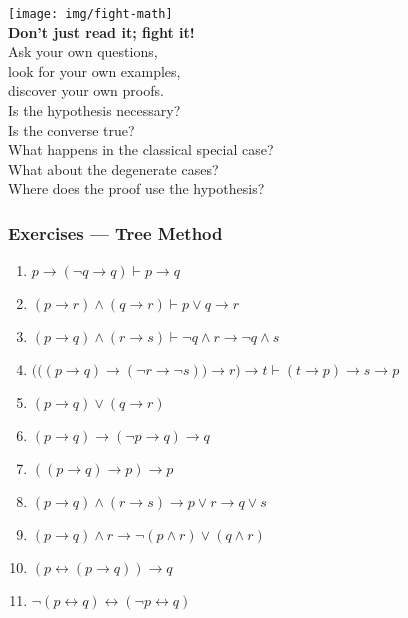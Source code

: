 \documentclass[UTF8,aspectratio=43,11pt,colorlinks,compress,openany]{beamer}%
\begin{document}
\begin{frame}\frametitle{}
\centering
\texttt{[image: img/fight-math]}\\
\textbf{Don't just read it; fight it!}\\
Ask your own questions,\\
look for your own examples,\\
discover your own proofs.\\
Is the hypothesis necessary?\\
Is the converse true?\\
What happens in the classical special case?\\
What about the degenerate cases?\\
Where does the proof use the hypothesis?
\end{frame}

\begin{frame}\frametitle{Exercises --- Tree Method}
		\begin{enumerate}
			\item $p\to(\neg q\to q)\vdash p\to q$
			\item $(p\to r)\wedge(q\to r)\vdash p\vee q\to r$
			\item $(p\to q)\wedge(r\to s)\vdash\neg q\wedge r\to\neg q\wedge s$
			\item $\Big(\big((p\to q)\to(\neg r\to\neg s)\big)\to r\Big)\to t\vdash (t\to p)\to s\to p$
			\item $(p\to q)\vee(q\to r)$
			\item $(p\to q)\to(\neg p\to q)\to q$
			\item $((p\to q)\to p)\to p$
			\item $(p\to q)\wedge(r\to s)\to p\vee r\to q\vee s$
			\item $(p\to q)\wedge r\to\neg(p\wedge r)\vee(q\wedge r)$
			\item $(p\leftrightarrow(p\to q))\to q$
			\item $\neg(p\leftrightarrow q)\leftrightarrow(\neg p\leftrightarrow q)$
		\end{enumerate}
\end{frame}
\end{document}
